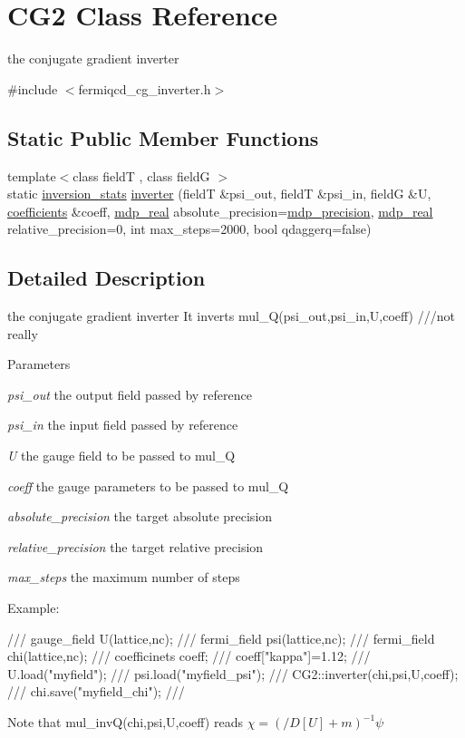 \hypertarget{class_c_g2}{
\section{CG2 Class Reference}
\label{class_c_g2}
}


the conjugate gradient inverter  


{\ttfamily \#include $<$fermiqcd\_\-cg\_\-inverter.h$>$}\subsection*{Static Public Member Functions}
\begin{DoxyCompactItemize}
\item 
{\footnotesize template$<$class fieldT , class fieldG $>$ }\\static \hyperlink{classinversion__stats}{inversion\_\-stats} \hyperlink{class_c_g2_aa094cee6eb38b07eeddabb8175b1eb57}{inverter} (fieldT \&psi\_\-out, fieldT \&psi\_\-in, fieldG \&U, \hyperlink{classcoefficients}{coefficients} \&coeff, \hyperlink{mdp__global__vars_8h_a049e4c1d4e74d644878a42f9909463e4}{mdp\_\-real} absolute\_\-precision=\hyperlink{mdp__global__vars_8h_a443a4ca745298420893e113a7ac926a9}{mdp\_\-precision}, \hyperlink{mdp__global__vars_8h_a049e4c1d4e74d644878a42f9909463e4}{mdp\_\-real} relative\_\-precision=0, int max\_\-steps=2000, bool qdaggerq=false)
\end{DoxyCompactItemize}


\subsection{Detailed Description}
the conjugate gradient inverter It inverts mul\_\-Q(psi\_\-out,psi\_\-in,U,coeff) ///not really 
\begin{DoxyParams}{Parameters}
\item[{\em psi\_\-out}]the output field passed by reference \item[{\em psi\_\-in}]the input field passed by reference \item[{\em U}]the gauge field to be passed to mul\_\-Q \item[{\em coeff}]the gauge parameters to be passed to mul\_\-Q \item[{\em absolute\_\-precision}]the target absolute precision \item[{\em relative\_\-precision}]the target relative precision \item[{\em max\_\-steps}]the maximum number of steps\end{DoxyParams}
Example: \begin{DoxyVerb}
/// gauge_field U(lattice,nc);
/// fermi_field psi(lattice,nc);
/// fermi_field chi(lattice,nc);
/// coefficinets coeff;
/// coeff["kappa"]=1.12;
/// U.load("myfield");
/// psi.load("myfield_psi");
/// CG2::inverter(chi,psi,U,coeff);
/// chi.save("myfield_chi");
/// \end{DoxyVerb}
 Note that mul\_\-invQ(chi,psi,U,coeff) reads $ \chi=(/\!\!\!D[U]+m)^{-1}\psi $ 

